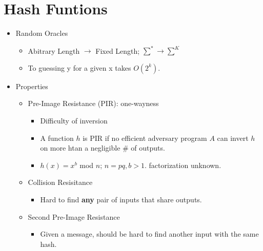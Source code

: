 \section{Hash Funtions}
\begin{itemize}
\item Random Oracles
    \begin{itemize}
    \item Abitrary Length $\rightarrow$ Fixed Length; $\sum^* \rightarrow \sum^K$
    \item To guessing y for a given x takes $O(2^k)$.
    \end{itemize}
\item Properties
    \begin{itemize}
    \item Pre-Image Resistance (PIR): one-wayness
        \begin{itemize}
        \item Difficulty of inversion
        \item A function $h$ is PIR if no efficient adversary program $A$ can invert $h$ on more htan a negligible # of outputs.
        \item $h(x) = x^b$ mod $n$; $n=pq, b>1$. factorization unknown.
        \end{itemize}
    \item Collision Resisitance
        \begin{itemize}
        \item Hard to find \textbf{any} pair of inputs that share outputs.
        \end{itemize}
    \item Second Pre-Image Resistance
        \begin{itemize}
        \item Given a message, should be hard to find another input with the same hash.
        \end{itemize}
    \end{itemize}
\end{itemize}